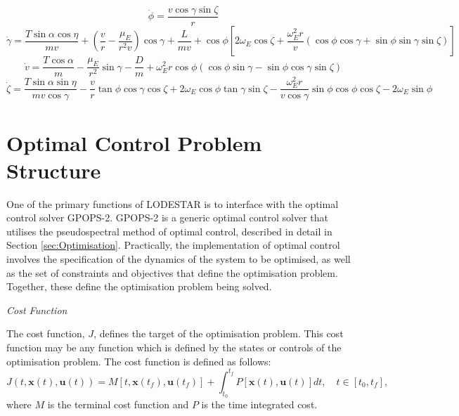 \begin{equation}
\dot{\phi} = \frac{v\cos\gamma\sin\zeta}{r}
\end{equation}
\begin{equation}
\dot{\gamma} = \frac{T\sin\alpha \cos\eta}{mv} + (\frac{v}{r}-\frac{\mu_E}{r^2 v})\cos\gamma + \frac{L}{mv}
+ \cos\phi[2\omega_E \cos\zeta + \frac{\omega_E^2 r}{v}(\cos\phi\cos\gamma+\sin\phi\sin\gamma\sin\zeta)]
\end{equation}
\begin{equation}
\dot{v} = \frac{T\cos\alpha}{m}-\frac{\mu_E}{r^2}\sin\gamma - \frac{D}{m}
+ \omega_E^2 r\cos\phi(\cos\phi\sin\gamma-\sin\phi\cos\gamma\sin\zeta)
\end{equation}
\begin{equation}\label{eq:heading}
\dot{\zeta} = \frac{T\sin\alpha \sin\eta}{mv \cos \gamma}-\frac{v}{r}\tan\phi\cos\gamma\cos\zeta +2\omega_E\cos\phi\tan\gamma\sin\zeta - \frac{\omega_E^2 r}{v\cos\gamma}\sin\phi\cos\phi\cos\zeta-2\omega_E\sin\phi 
\end{equation}




\section{Optimal Control Problem Structure}

One of the primary functions of LODESTAR is to interface with the optimal control solver GPOPS-2. GPOPS-2 is a generic optimal control solver that utilises the pseudospectral method of optimal control, described in detail in Section \ref{sec:Optimisation}. Practically, the implementation of optimal control involves the specification of the dynamics of the system to be optimised, as well as the set of constraints and objectives that define the optimisation problem. 
 Together, these define the optimisation problem being solved.

\noindent \textit{Cost Function}

\noindent The cost function, $J$, defines the target of the optimisation problem. 
This cost function may be any function which is defined by the states or controls of the optimisation problem. The cost function is defined as follows:
\begin{equation} \label{eq:cost}
J(t,\textbf{x}(t),\textbf{u}(t)) = M[t,\textbf{x}(t_f),\textbf{u}(t_f)] +   \int_{t_0}^{t_f} P[\textbf{x}(t),\textbf{u}(t)] dt, \quad t \in [t_0,t_f],
\end{equation}
where $M$ is the terminal cost function and $P$ is the time integrated cost. 

